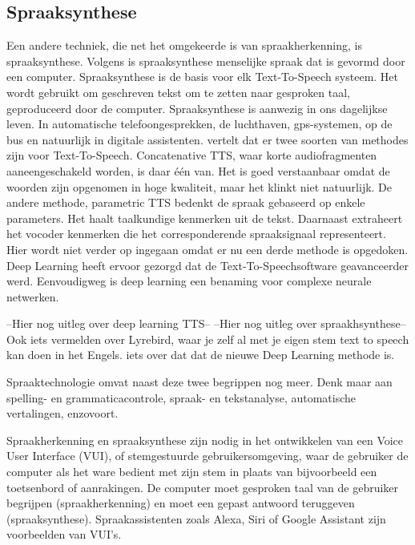 \subsection{Spraaksynthese}
Een andere techniek, die net het omgekeerde is van spraakherkenning, is spraaksynthese. Volgens \autocite{Rouse2016} is spraaksynthese menselijke spraak dat is gevormd door een computer. Spraaksynthese is de basis voor elk Text-To-Speech systeem. Het wordt gebruikt om geschreven tekst om te zetten naar gesproken taal, geproduceerd door de computer.
Spraaksynthese is aanwezig in ons dagelijkse leven. In automatische telefoongesprekken, de luchthaven, gps-systemen, op de bus en natuurlijk in digitale assistenten. \autocite{Seijas2018} vertelt dat er twee soorten van methodes zijn voor Text-To-Speech. Concatenative TTS, waar korte audiofragmenten aaneengeschakeld worden, is daar één van. Het is goed verstaanbaar omdat de woorden zijn opgenomen in hoge kwaliteit, maar het klinkt niet natuurlijk. De andere methode, parametric TTS bedenkt de spraak gebaseerd op enkele parameters. Het haalt taalkundige kenmerken uit de tekst. Daarnaast extraheert het vocoder kenmerken die het corresponderende spraaksignaal representeert. Hier wordt niet verder op ingegaan omdat er nu een derde methode is opgedoken.
Deep Learning heeft ervoor gezorgd dat de Text-To-Speechsoftware geavanceerder werd. Eenvoudigweg is deep learning een benaming voor complexe neurale netwerken. 

--Hier nog uitleg over deep learning TTS--
--Hier nog uitleg over spraakhsynthese--
Ook iets vermelden over Lyrebird, waar je zelf al met je eigen stem text to speech kan doen in het Engels. iets over dat dat de nieuwe Deep Learning methode is.

Spraaktechnologie omvat naast deze twee begrippen nog meer. Denk maar aan spelling- en grammaticacontrole, spraak- en tekstanalyse, automatische vertalingen, enzovoort.

Spraakherkenning en spraaksynthese zijn nodig in het ontwikkelen van een Voice User Interface (VUI), of stemgestuurde gebruikersomgeving, waar de gebruiker de computer als het ware bedient met zijn stem in plaats van bijvoorbeeld een toetsenbord of aanrakingen. De computer moet gesproken taal van de gebruiker begrijpen (spraakherkenning) en moet een gepast antwoord teruggeven (spraaksynthese). Spraakassistenten zoals Alexa, Siri of Google Assistant zijn voorbeelden van VUI's.

